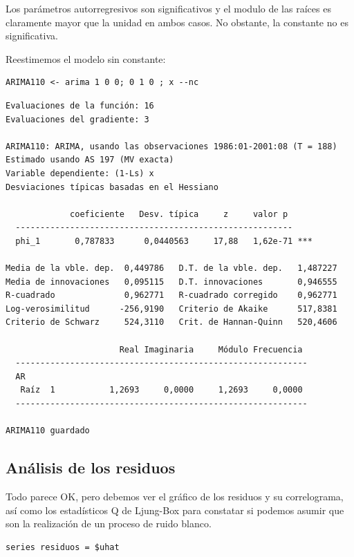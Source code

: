 \documentclass[10pt]{article}
\begin{document}
Los parámetros autorregresivos son significativos y el modulo de las
raíces es claramente mayor que la unidad en ambos casos. No obstante,
la constante no es significativa. 

Reestimemos el modelo sin constante:

\begin{verbatim}
ARIMA110 <- arima 1 0 0; 0 1 0 ; x --nc
\end{verbatim}

\begin{verbatim}
Evaluaciones de la función: 16
Evaluaciones del gradiente: 3

ARIMA110: ARIMA, usando las observaciones 1986:01-2001:08 (T = 188)
Estimado usando AS 197 (MV exacta)
Variable dependiente: (1-Ls) x
Desviaciones típicas basadas en el Hessiano

             coeficiente   Desv. típica     z     valor p 
  --------------------------------------------------------
  phi_1       0,787833      0,0440563     17,88   1,62e-71 ***

Media de la vble. dep.  0,449786   D.T. de la vble. dep.   1,487227
Media de innovaciones   0,095115   D.T. innovaciones       0,946555
R-cuadrado              0,962771   R-cuadrado corregido    0,962771
Log-verosimilitud      -256,9190   Criterio de Akaike      517,8381
Criterio de Schwarz     524,3110   Crit. de Hannan-Quinn   520,4606

                       Real Imaginaria     Módulo Frecuencia
  -----------------------------------------------------------
  AR
   Raíz  1           1,2693     0,0000     1,2693     0,0000
  -----------------------------------------------------------

ARIMA110 guardado
\end{verbatim}
\subsection*{Análisis de los residuos}
\label{sec:orgd2318df}

Todo parece OK, pero debemos ver el gráfico de los residuos y su
correlograma, así como los estadísticos Q de Ljung-Box para constatar
si podemos asumir que son la realización de un proceso de ruido
blanco.

\begin{verbatim}
series residuos = $uhat
\end{verbatim}
\end{document}

